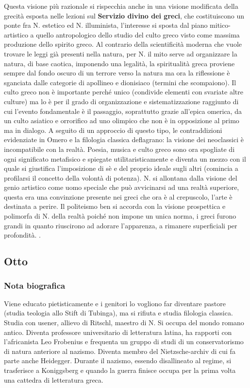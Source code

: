 \documentclass[10pt,a4paper]{article}
\begin{document}
Questa visione più razionale si rispecchia anche in una visione modificata della grecità esposta nelle lezioni sul \textbf{Servizio divino dei greci}, che costituiscono un ponte fra N. estetico ed N. illuminista, l'interesse si sposta dal piano mitico-artistico a quello antropologico dello studio del culto greco visto come massima produzione dello spirito greco. Al contrario della scientificità moderna che vuole trovare le leggi già presenti nella natura, per N. il mito serve ad organizzare la natura, di base caotica, imponendo una legalità, la spiritualità greca proviene sempre dal fondo oscuro di un terrore verso la natura ma ora la riflessione è sganciata dalle categorie di apollineo e dionisiaco (termini che scompaiono). Il culto greco non è importante perché unico (condivide elementi con svariate altre culture) ma lo è per il grado di organizzazione e sistematizzazione raggiunto di cui l'evento fondamentale è il passaggio, soprattutto grazie all'epica omerica, da un culto asiatico e orrorifico ad uno olimpico che non è in opposizione al primo ma in dialogo. A seguito di un approccio di questo tipo, le contraddizioni evidenziate in Omero e la filologia classica deflagrano: la visione dei neoclassici è incompatibile con la realtà. Poesia, musica e culto greco sono ora spogliate di ogni significato metafisico e spiegate utilitaristicamente e diventa un mezzo con il quale si giustifica l'imposizione di sè e del proprio ideale sugli altri (comincia a profilarsi il concetto della volontà di potenza). N. si allontana dalla visione del genio artistico come uomo speciale che può avvicinarsi ad una realtà superiore, questa era una convinzione presente nei greci che ora è al crepuscolo, l'arte è destinata a perire. Il politeismo ben si accorda con la visione prospettica e polimorfa di N. della realtà poiché non impone un unica norma, i greci furono grandi in quanto riuscirono ad adorare l'apparenza, a rimanere superficiali per profondità. 
.\subsection{Otto}
\subsubsection{Nota biografica}
Viene educato pietisticamente e i genitori lo vogliono far diventare pastore (studia teologia allo Stift di Tubinga), ma si rifiuta e studia filologia classica. Studia con usener, allievo di Ritschl, maestro di N. Si occupa del mondo romano antico. Diventa professore universitario di letteratura latina, ha rapporti con l'africanista Leo Frobenius e frequenta un gruppo di studi di un conservatorismo di natura anteriore al nazismo. Diventa membro del Nietzsche-archiv di cui fa parte anche Heidegger. Durante il nazismo, essendo disallineato al regime, si trasferisce a Koniggsberg e quando la guerra finisce occupa per la prima volta una cattedra di letteratura greca.  
\end{document}
